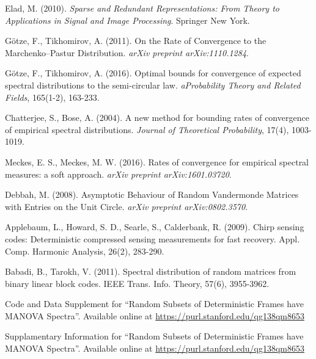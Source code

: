 \documentclass[a4paper,12pt]{article}
\begin{document}
\begin{thebibliography}{1}

Elad, M. (2010). \emph{Sparse and Redundant Representations: From Theory to Applications in Signal and
Image Processing}. Springer New York.



 G{\"o}tze, F., Tikhomirov, A. (2011). On the Rate of Convergence to the Marchenko--Pastur Distribution. \emph{arXiv preprint arXiv:1110.1284}.

    
 G{\"o}tze, F., Tikhomirov, A. (2016). Optimal bounds for convergence of expected spectral distributions to the semi-circular law. \emph{aProbability Theory and Related Fields}, 165(1-2), 163-233.


Chatterjee, S., Bose, A. (2004). A new method for bounding rates of convergence of empirical spectral distributions. \emph{Journal of Theoretical Probability}, 17(4), 1003-1019.

    
Meckes, E. S., Meckes, M. W. (2016). Rates of convergence for empirical spectral measures: a soft approach. \emph{arXiv preprint arXiv:1601.03720}.

 Debbah, M. (2008). Asymptotic Behaviour of Random Vandermonde Matrices with Entries on the Unit Circle. \emph{arXiv preprint arXiv:0802.3570}.

 Applebaum, L., Howard, S. D., Searle, S.,  Calderbank, R. (2009). Chirp sensing codes: Deterministic compressed sensing measurements for fast recovery. Appl. Comp. Harmonic Analysis, 26(2), 283-290.

 Babadi, B., Tarokh, V. (2011). Spectral distribution of random matrices from binary linear block codes. IEEE Trans. Info. Theory, 57(6), 3955-3962.

	Code and Data Supplement for ``Random Subsets of Deterministic Frames have
	MANOVA Spectra''. Available online at \url{https://purl.stanford.edu/qg138qm8653}

	Supplamentary Information for ``Random Subsets of Deterministic Frames have
	MANOVA Spectra''. Available online at 
    \url{https://purl.stanford.edu/qg138qm8653}
    
\end{thebibliography}
\end{document}
